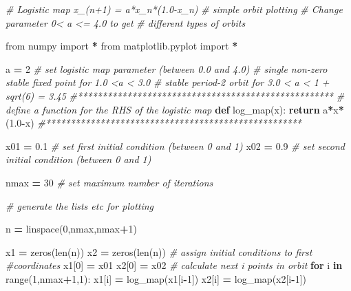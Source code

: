 \documentclass[
  a4paper,
  oneside,
  final]{krantz}
\newenvironment{Shaded}{\begin{snugshade}}{\end{snugshade}}
\newcommand{\BuiltInTok}[1]{#1}
\newcommand{\CommentTok}[1]{\textcolor[rgb]{0.56,0.35,0.01}{\textit{#1}}}
\newcommand{\ControlFlowTok}[1]{\textcolor[rgb]{0.13,0.29,0.53}{\textbf{#1}}}
\newcommand{\DecValTok}[1]{\textcolor[rgb]{0.00,0.00,0.81}{#1}}
\newcommand{\FloatTok}[1]{\textcolor[rgb]{0.00,0.00,0.81}{#1}}
\newcommand{\ImportTok}[1]{#1}
\newcommand{\KeywordTok}[1]{\textcolor[rgb]{0.13,0.29,0.53}{\textbf{#1}}}
\newcommand{\NormalTok}[1]{#1}
\newcommand{\OperatorTok}[1]{\textcolor[rgb]{0.81,0.36,0.00}{\textbf{#1}}}
\theoremstyle{definition}
\theoremstyle{definition}
\theoremstyle{definition}
\theoremstyle{definition}
\theoremstyle{remark}
\begin{document}
\begin{Shaded}
\begin{Highlighting}[]


\CommentTok{\# Logistic map x\_(n+1) = a*x\_n*(1.0{-}x\_n) }
\CommentTok{\# simple orbit plotting}
\CommentTok{\# Change parameter 0\textless{} a \textless{}= 4.0 to get }
\CommentTok{\# different types of orbits}

\ImportTok{from}\NormalTok{ numpy }\ImportTok{import} \OperatorTok{*}
\ImportTok{from}\NormalTok{ matplotlib.pyplot }\ImportTok{import} \OperatorTok{*}

\NormalTok{a }\OperatorTok{=} \DecValTok{2}   
\CommentTok{\# set logistic map parameter (between 0.0 and 4.0)}
\CommentTok{\# single non{-}zero stable fixed point for 1.0 \textless{}a \textless{} 3.0}
\CommentTok{\# stable period{-}2 orbit for 3.0 \textless{} a \textless{} 1 + sqrt(6) = 3.45}
\CommentTok{\#****************************************************}
\CommentTok{\# define a function for the RHS of the logistic map}
\KeywordTok{def}\NormalTok{ log\_map(x):}
    \ControlFlowTok{return}\NormalTok{ a}\OperatorTok{*}\NormalTok{x}\OperatorTok{*}\NormalTok{(}\FloatTok{1.0}\OperatorTok{{-}}\NormalTok{x) }
\CommentTok{\#****************************************************}

\NormalTok{x01 }\OperatorTok{=} \FloatTok{0.1} \CommentTok{\# set first initial condition (between 0 and 1)}
\NormalTok{x02 }\OperatorTok{=} \FloatTok{0.9} \CommentTok{\# set second initial condition (between 0 and 1)}

\NormalTok{nmax }\OperatorTok{=} \DecValTok{30} \CommentTok{\# set maximum number of iterations}

\CommentTok{\# generate the lists etc for plotting}

\NormalTok{n }\OperatorTok{=}\NormalTok{ linspace(}\DecValTok{0}\NormalTok{,nmax,nmax}\OperatorTok{+}\DecValTok{1}\NormalTok{)}

\NormalTok{x1 }\OperatorTok{=}\NormalTok{ zeros(}\BuiltInTok{len}\NormalTok{(n))}
\NormalTok{x2 }\OperatorTok{=}\NormalTok{ zeros(}\BuiltInTok{len}\NormalTok{(n))}
\CommentTok{\# assign initial conditions to first}
\CommentTok{\#coordinates}
\NormalTok{x1[}\DecValTok{0}\NormalTok{] }\OperatorTok{=}\NormalTok{ x01  }
\NormalTok{x2[}\DecValTok{0}\NormalTok{] }\OperatorTok{=}\NormalTok{ x02  }
\CommentTok{\# calculate next i points in orbit}
\ControlFlowTok{for}\NormalTok{ i }\KeywordTok{in} \BuiltInTok{range}\NormalTok{(}\DecValTok{1}\NormalTok{,nmax}\OperatorTok{+}\DecValTok{1}\NormalTok{,}\DecValTok{1}\NormalTok{):}
\NormalTok{    x1[i] }\OperatorTok{=}\NormalTok{ log\_map(x1[i}\OperatorTok{{-}}\DecValTok{1}\NormalTok{])  }
\NormalTok{    x2[i] }\OperatorTok{=}\NormalTok{ log\_map(x2[i}\OperatorTok{{-}}\DecValTok{1}\NormalTok{])   }
\end{Highlighting}
\end{Shaded}
\end{document}
